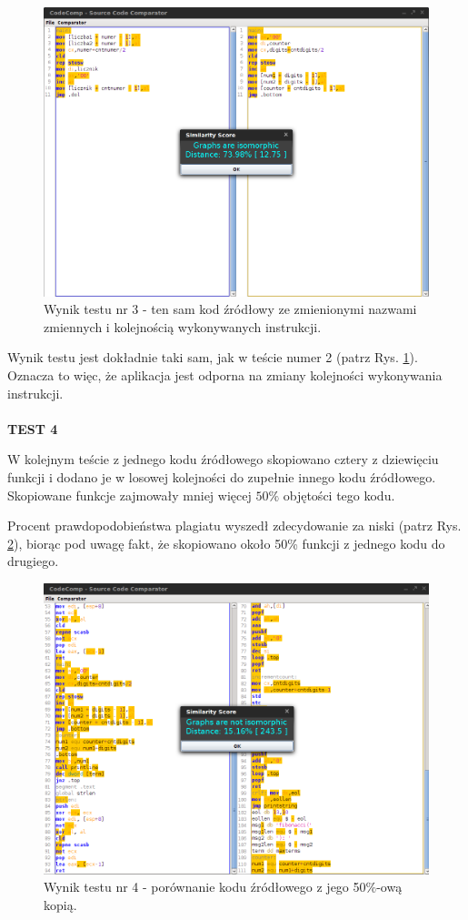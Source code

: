 \documentclass[a4paper,12pt]{article}
\begin{document}
\begin{figure}[here]
\centering
\includegraphics[scale=0.4]{gfx/test3.png}
\caption{Wynik testu nr 3 - ten sam kod źródłowy ze zmienionymi nazwami zmiennych i kolejnością wykonywanych instrukcji.}
\label{fig:test3}
\end{figure}

Wynik testu jest dokładnie taki sam, jak w teście numer 2 (patrz Rys. \ref{fig:test3}). Oznacza to więc, że aplikacja jest odporna na zmiany kolejności wykonywania instrukcji.
\\
\pagebreak
\\
\textbf{TEST 4}

W kolejnym teście z jednego kodu źródłowego skopiowano cztery z dziewięciu funkcji i dodano je w losowej kolejności do zupełnie innego kodu źródłowego. Skopiowane funkcje zajmowały mniej więcej $50\%$ objętości tego kodu.

Procent prawdopodobieństwa plagiatu wyszedł zdecydowanie za niski (patrz Rys. \ref{fig:test4}), biorąc pod uwagę fakt, że skopiowano około 50\% funkcji z jednego kodu do drugiego.

\begin{figure}[h!]
\centering
\includegraphics[scale=0.4]{gfx/test4.png}
\caption{Wynik testu nr 4 - porównanie kodu źródłowego z jego 50$\%$-ową kopią.}
\label{fig:test4}
\end{figure}
\end{document}
